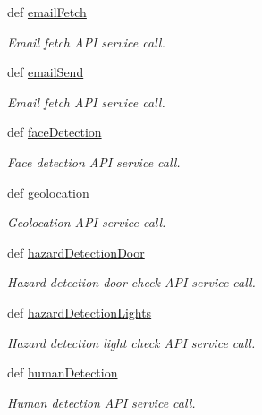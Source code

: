 \begin{DoxyCompactItemize}
def \hyperlink{classRappCloud_1_1RappPlatformApi_1_1RappPlatformAPI_a5ce1f3bf34f4361c8ceec7db35fe9a8c}{email\-Fetch}
\begin{DoxyCompactList}\small\item\em Email fetch A\-P\-I service call. \end{DoxyCompactList}\item 
def \hyperlink{classRappCloud_1_1RappPlatformApi_1_1RappPlatformAPI_afbfc116f6b2bdbb143b9a949c43c9859}{email\-Send}
\begin{DoxyCompactList}\small\item\em Email fetch A\-P\-I service call. \end{DoxyCompactList}\item 
def \hyperlink{classRappCloud_1_1RappPlatformApi_1_1RappPlatformAPI_ae6ad1915846a1214153f71dcdce47da7}{face\-Detection}
\begin{DoxyCompactList}\small\item\em Face detection A\-P\-I service call. \end{DoxyCompactList}\item 
def \hyperlink{classRappCloud_1_1RappPlatformApi_1_1RappPlatformAPI_a89ba9d5132d397eaf7a3574aaa10d126}{geolocation}
\begin{DoxyCompactList}\small\item\em Geolocation A\-P\-I service call. \end{DoxyCompactList}\item 
def \hyperlink{classRappCloud_1_1RappPlatformApi_1_1RappPlatformAPI_a88346cc1e16de3a929c0fdf9d3e24933}{hazard\-Detection\-Door}
\begin{DoxyCompactList}\small\item\em Hazard detection door check A\-P\-I service call. \end{DoxyCompactList}\item 
def \hyperlink{classRappCloud_1_1RappPlatformApi_1_1RappPlatformAPI_a7b122f8680459dca596cdc11bf6279b4}{hazard\-Detection\-Lights}
\begin{DoxyCompactList}\small\item\em Hazard detection light check A\-P\-I service call. \end{DoxyCompactList}\item 
def \hyperlink{classRappCloud_1_1RappPlatformApi_1_1RappPlatformAPI_a956f8eae0b8a2cdbf34efa1ddbab3f95}{human\-Detection}
\begin{DoxyCompactList}\small\item\em Human detection A\-P\-I service call. \end{DoxyCompactList}\item 

\end{DoxyCompactItemize}
